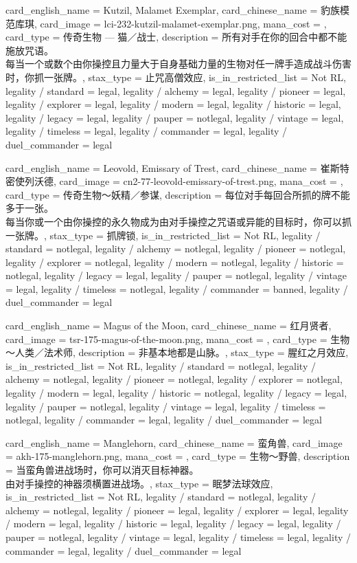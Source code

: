 \documentclass[lang = cn, color = black, 10pt]{AllThatStax}
\begin{document}
\card
{
	card_english_name = {Kutzil, Malamet Exemplar},
	card_chinese_name = {豹族模范库琪},
	card_image = lci-232-kutzil-malamet-exemplar.png,
	mana_cost = ,
	card_type = 传奇生物 — 猫／战士,
	description = {所有对手在你的回合中都不能施放咒语。\\
		每当一个或数个由你操控且力量大于自身基础力量的生物对任一牌手造成战斗伤害时，你抓一张牌。},
	stax_type = 止咒高僧效应,
	is_in_restricted_list = Not RL,
	legality / standard = legal,
	legality / alchemy = legal,
	legality / pioneer = legal,
	legality / explorer = legal,
	legality / modern = legal,
	legality / historic = legal,
	legality / legacy = legal,
	legality / pauper = notlegal,
	legality / vintage = legal,
	legality / timeless = legal,
	legality / commander = legal,
	legality / duel_commander = legal
}

\card
{
	card_english_name = {Leovold, Emissary of Trest},
	card_chinese_name = {崔斯特密使列沃德},
	card_image = cn2-77-leovold-emissary-of-trest.png,
	mana_cost = ,
	card_type = 传奇生物～妖精／参谋,
	description = {每位对手每回合所抓的牌不能多于一张。\\
		每当你或一个由你操控的永久物成为由对手操控之咒语或异能的目标时，你可以抓一张牌。},
	stax_type = 抓牌锁,
	is_in_restricted_list = Not RL,
	legality / standard = notlegal,
	legality / alchemy = notlegal,
	legality / pioneer = notlegal,
	legality / explorer = notlegal,
	legality / modern = notlegal,
	legality / historic = notlegal,
	legality / legacy = legal,
	legality / pauper = notlegal,
	legality / vintage = legal,
	legality / timeless = notlegal,
	legality / commander = banned,
	legality / duel_commander = legal
}

\card
{
	card_english_name = {Magus of the Moon},
	card_chinese_name = {红月贤者},
	card_image = tsr-175-magus-of-the-moon.png,
	mana_cost = ,
	card_type = 生物 ～人类／法术师,
	description = {非基本地都是山脉。},
	stax_type = 腥红之月效应,
	is_in_restricted_list = Not RL,
	legality / standard = notlegal,
	legality / alchemy = notlegal,
	legality / pioneer = notlegal,
	legality / explorer = notlegal,
	legality / modern = legal,
	legality / historic = notlegal,
	legality / legacy = legal,
	legality / pauper = notlegal,
	legality / vintage = legal,
	legality / timeless = notlegal,
	legality / commander = legal,
	legality / duel_commander = legal
}

\card
{
	card_english_name = {Manglehorn},
	card_chinese_name = {蛮角兽},
	card_image = akh-175-manglehorn.png,
	mana_cost = ,
	card_type = 生物～野兽,
	description = {当蛮角兽进战场时，你可以消灭目标神器。\\
		由对手操控的神器须横置进战场。},
	stax_type = 眠梦法球效应,
	is_in_restricted_list = Not RL,
	legality / standard = notlegal,
	legality / alchemy = notlegal,
	legality / pioneer = legal,
	legality / explorer = legal,
	legality / modern = legal,
	legality / historic = legal,
	legality / legacy = legal,
	legality / pauper = notlegal,
	legality / vintage = legal,
	legality / timeless = legal,
	legality / commander = legal,
	legality / duel_commander = legal
}
\end{document}
